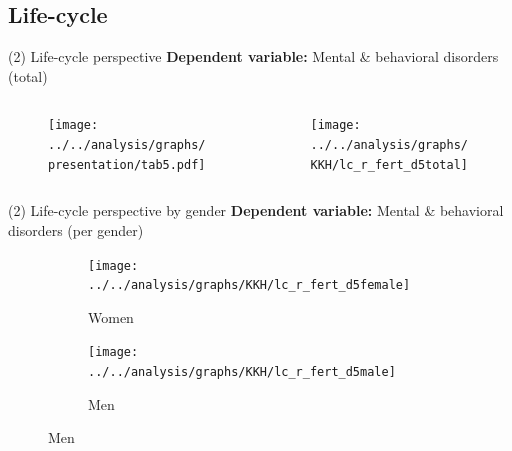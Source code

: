 \documentclass[aspectratio=169,handout]{beamer} %
\begin{document}
\subsection{Life-cycle}
\begin{frame}{(2) Life-cycle perspective}
\vspace{1 em}
\textbf{Dependent variable:} Mental \& behavioral disorders (total)
\vspace{-0.7 em}
\begin{columns}
	\begin{column}{.3\linewidth}
	\begin{figure}
		\texttt{[image: ../../analysis/graphs/presentation/tab5.pdf]}
	\end{figure}

	\end{column}
	\begin{column}{.7\linewidth}
	\begin{figure}
		\texttt{[image: ../../analysis/graphs/KKH/lc\_r\_fert\_d5total]}
	\end{figure}
	\end{column}
\end{columns}
\end{frame}
\begin{frame}{(2) Life-cycle perspective by gender}
\vspace{1 em}
\textbf{Dependent variable:} Mental \& behavioral disorders (per gender)
\vspace{-0.7 em}
\begin{figure}\centering
\begin{subfigure}[h]{0.49\linewidth}\centering\caption{Women}
	\texttt{[image: ../../analysis/graphs/KKH/lc\_r\_fert\_d5female]}
\end{subfigure}
\begin{subfigure}[h]{0.49\linewidth}\centering\caption{Men}
	\texttt{[image: ../../analysis/graphs/KKH/lc\_r\_fert\_d5male]}
\end{subfigure}
\end{figure}
\end{frame}


	

%
%
%
%
%
%
%
%
\end{document}
